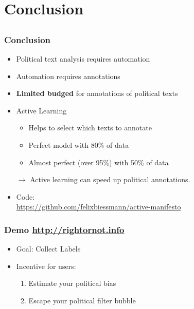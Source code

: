 \documentclass[]{beamer}
\begin{document}
\section{Conclusion}
\subsection{}


\begin{frame}\frametitle{Conclusion}
\begin{itemize}
\item Political text analysis requires automation
\item Automation requires annotations
\item \textbf{Limited budged} for annotations of political texts 
\item Active Learning
\begin{itemize}
\item Helps to select which texts to annotate
\item Perfect model with 80\% of data
\item Almost perfect (over 95\%) with 50\% of data
\end{itemize}
\item[$\rightarrow$] Active learning can speed up political annotations. 
\item Code:\\
\footnotesize
 \url{https://github.com/felixbiessmann/active-manifesto} 
\end{itemize}
\end{frame}



\begin{frame}\frametitle{Demo \url{http://rightornot.info}}
\begin{itemize}
\item Goal: Collect Labels
\item Incentive for users: 
\begin{enumerate}
\item Estimate your political bias
\item Escape your political filter bubble
\end{enumerate}
\end{itemize}
\centering
\end{frame}
\end{document}
